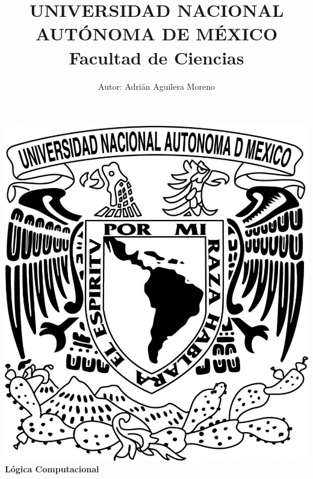 \documentclass{article}
\begin{document}
\title{UNIVERSIDAD NACIONAL AUT\'ONOMA DE M\'EXICO\\ Facultad de Ciencias}
\author{Autor: Adri\'an Aguilera Moreno}
\date{}
\maketitle
\begin{center}
  \includegraphics[scale=0.20]{../Imagen/Portada.jpg}\\[0.4cm]
  \Large
  \bf{Lógica Computacional}
  \normalsize
\end{center}
\newpage
{}
\end{document}
